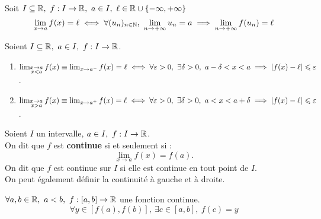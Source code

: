 \begin{theorem}
	Soit $I \subseteq \mathbb{R},\ f : I \to \mathbb{R},\ a \in I,\ \ell \in \mathbb{R} \cup \{-\infty, +\infty\}$
	\[ \lim_{x \to a} f(x) = \ell \iff \forall (u_n)_{n \in \mathbb{N}},\ \lim_{n \to +\infty} u_n = a \implies \lim_{n \to +\infty} f(u_n) = \ell \]
\end{theorem}

\begin{definition}
    Soient $I \subseteq \mathbb{R},\ a \in I,\ f : I \to \mathbb{R} $.
    \begin{enumerate}
        \item $ \lim_{\substack{x \to a \\ x < a}} f(x) \equiv \lim_{x \to a^-} f(x) = \ell \iff \forall \varepsilon > 0,\ \exists \delta > 0,\ a - \delta < x < a \implies \abs{f(x) - \ell} \leqslant \varepsilon $.
        \item $\lim_{\substack{x \to a \\ x > a}} f(x) \equiv \lim_{x \to a^+} f(x) = \ell \iff \forall \varepsilon > 0,\ \exists \delta > 0,\ a < x < a + \delta \implies \abs{f(x) - \ell} \leqslant \varepsilon$.
    \end{enumerate}
\end{definition}

\begin{definition}[Continuité]
	Soient $I$ un intervalle, $a \in I,\ f : I \to \mathbb{R}$.
        \\ 
        On dit que $f$ est \textbf{continue} si et seulement si :
        \[\lim_{x \to a} f(x) = f(a).\] 
	On dit que $f$ est continue sur $I$ si elle est continue en tout point de $I$.\\
	On peut également définir la continuité à gauche et à droite.
\end{definition}

\begin{theorem}
	$\forall a, b \in \mathbb{R},\ a < b,\ f : [a, b] \to \mathbb{R}$ une fonction continue.
	\[ \forall y \in [f(a), f(b)],\ \exists c \in [a, b],\ f(c) = y \]
\end{theorem}

